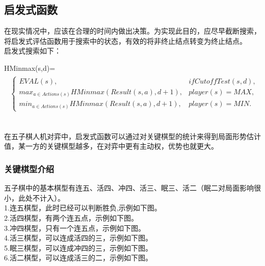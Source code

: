 \documentclass{acm_proc_article-sp}
\begin{document}
\subsection{\textbf{启发式函数}}
在现实情况中，应该在合理的时间内做出决策。为实现此目的，应尽早截断搜索，将启发式评估函数用于搜索中的状态，有效的将非终止结点转变为终止结点。\\
启发式搜索如下：\\
\begin{tiny}
HMinmax(s,d)=\\
\begin{equation}
\begin{split}
\begin{aligned}
\left\{
\begin{array}{lr} 
EVAL(s),& if CutoffTest(s,d), \\
max_{a\in Actions(s)}HMinmax(Result(s,a),d+1) , & player(s)=MAX,\\
min_{a\in Actions(s)}HMinmax(Result(s,a),d+1), & player(s)=MIN.
\end{array}
\right.
\end{aligned}
\end{split}
\end{equation}
\end{tiny}
\\
在五子棋人机对弈中，启发式函数可以通过对关键棋型的统计来得到局面形势估计值，某一方的关键棋型越多，在对弈中更有主动权，优势也就更大。\\
\subsubsection{\textbf{关键棋型介绍}}
五子棋中的基本棋型有连五、活四、冲四、活三、眠三、活二（眠二对局面影响很小，此处不计入）。\\
1.连五棋型，此时已经可以判断胜负,示例如下图。\\
2.活四棋型，有两个连五点，示例如下图。\\
3.冲四棋型，只有一个连五点，示例如下图。\\
4.活三棋型，可以连成活四的三，示例如下图。\\
5.眠三棋型，可以连成冲四的三，示例如下图。\\
6.活二棋型，可以连成活三的二，示例如下图。\\
\end{document}
